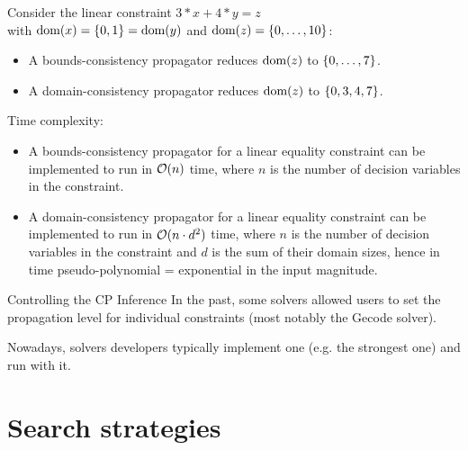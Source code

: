 \documentclass{cons-beamer}
\begin{document}
\begin{frame}
  \begin{example}
    Consider the linear constraint $3 * x + 4 * y = z$ \\
    with $\textnormal{dom}(x) = \left\{0,1\right\} =
    \textnormal{dom}(y)$ and $\textnormal{dom}(z) =
    \left\{0,\dots,10\right\}$:
    \begin{itemize}
      \item A bounds-consistency propagator reduces
        $\textnormal{dom}(z)$ to $\left\{0,\dots,7\right\}$.
      \item A domain-consistency propagator reduces
        $\textnormal{dom}(z)$ to $\left\{0,3,4,7\right\}$.
    \end{itemize}
    \vfill

    Time complexity:
    \begin{itemize}
      \item A bounds-consistency propagator for a linear equality
        constraint can be implemented to run in $\mathcal{O}(n)$ time, where $n$
        is the number of decision variables in the constraint. 
      \item A domain-consistency propagator for a linear equality
        constraint can be implemented to run in $\mathcal{O}(n \cdot d^2)$ time,
        where $n$ is the number of decision variables in the constraint
        and $d$ is the sum of their domain sizes, hence in time
        pseudo-polynomial = exponential in the input magnitude.
    \end{itemize}
  \end{example}
\end{frame}

\begin{frame}{Controlling the CP Inference} 
  In the past, some solvers allowed users to set the propagation level for individual constraints (most notably the Gecode solver).
  \vfill

  Nowadays, solvers developers typically implement one (e.g. the strongest one) and run with it.
  \vfill

\end{frame}


\section{Search strategies}
\end{document}
